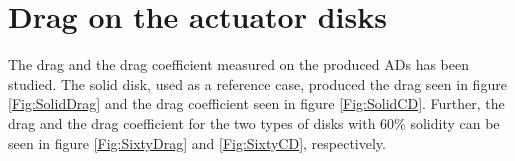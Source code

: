 \section{Drag on the actuator disks}

The drag and the drag coefficient measured on the produced \gls{AD}s has been studied. The solid disk, used as a reference case, produced the drag seen in figure \ref{Fig:SolidDrag} and the drag coefficient seen in figure \ref{Fig:SolidCD}. Further, the drag and the drag coefficient for the two types of disks with 60\% solidity can be seen in figure \ref{Fig:SixtyDrag} and \ref{Fig:SixtyCD}, respectively. 



